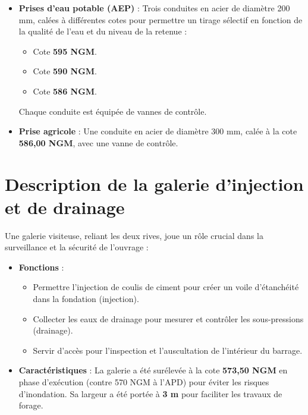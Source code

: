 \begin{itemize}
    \item \textbf{Prises d'eau potable (AEP)} : Trois conduites en acier de diamètre 200 mm, calées à différentes cotes pour permettre un tirage sélectif en fonction de la qualité de l'eau et du niveau de la retenue :
    \begin{itemize}
        \item Cote \textbf{595 NGM}.
        \item Cote \textbf{590 NGM}.
        \item Cote \textbf{586 NGM}.
    \end{itemize}
    Chaque conduite est équipée de vannes de contrôle.
    \item \textbf{Prise agricole} : Une conduite en acier de diamètre 300 mm, calée à la cote \textbf{586,00 NGM}, avec une vanne de contrôle.
\end{itemize}

\section{Description de la galerie d'injection et de drainage}
\label{sec:galerie}

Une galerie visiteuse, reliant les deux rives, joue un rôle crucial dans la surveillance et la sécurité de l'ouvrage \cite{fiche_historique, fiche_synoptique} :
\begin{itemize}
    \item \textbf{Fonctions} :
    \begin{itemize}
        \item Permettre l'injection de coulis de ciment pour créer un voile d'étanchéité dans la fondation (injection).
        \item Collecter les eaux de drainage pour mesurer et contrôler les sous-pressions (drainage).
        \item Servir d'accès pour l'inspection et l'auscultation de l'intérieur du barrage.
    \end{itemize}
    \item \textbf{Caractéristiques} : La galerie a été surélevée à la cote \textbf{573,50 NGM} en phase d'exécution (contre 570 NGM à l'APD) pour éviter les risques d'inondation. Sa largeur a été portée à \textbf{3 m} pour faciliter les travaux de forage.
\end{itemize}

